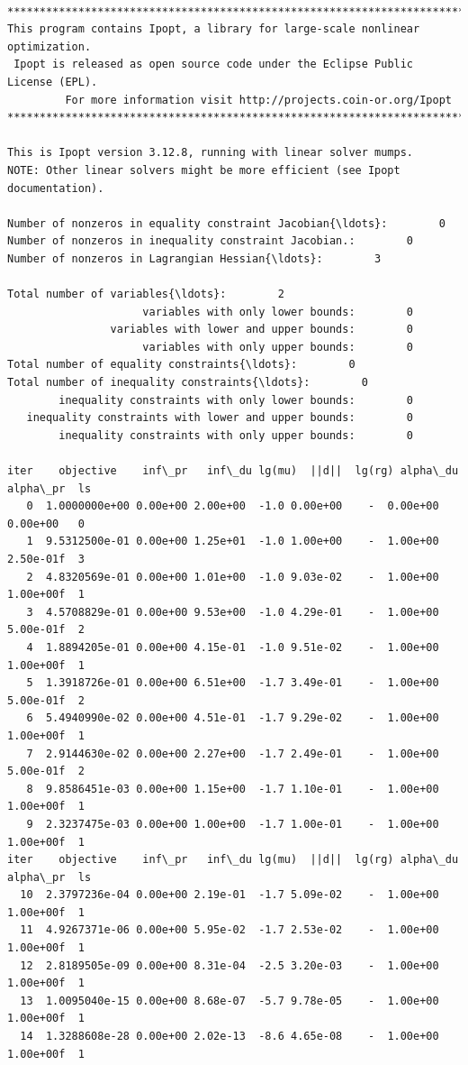 \documentclass[11pt]{article}
\begin{document}
    \begin{Verbatim}[commandchars=\\\{\}]

******************************************************************************
This program contains Ipopt, a library for large-scale nonlinear optimization.
 Ipopt is released as open source code under the Eclipse Public License (EPL).
         For more information visit http://projects.coin-or.org/Ipopt
******************************************************************************

This is Ipopt version 3.12.8, running with linear solver mumps.
NOTE: Other linear solvers might be more efficient (see Ipopt documentation).

Number of nonzeros in equality constraint Jacobian{\ldots}:        0
Number of nonzeros in inequality constraint Jacobian.:        0
Number of nonzeros in Lagrangian Hessian{\ldots}:        3

Total number of variables{\ldots}:        2
                     variables with only lower bounds:        0
                variables with lower and upper bounds:        0
                     variables with only upper bounds:        0
Total number of equality constraints{\ldots}:        0
Total number of inequality constraints{\ldots}:        0
        inequality constraints with only lower bounds:        0
   inequality constraints with lower and upper bounds:        0
        inequality constraints with only upper bounds:        0

iter    objective    inf\_pr   inf\_du lg(mu)  ||d||  lg(rg) alpha\_du alpha\_pr  ls
   0  1.0000000e+00 0.00e+00 2.00e+00  -1.0 0.00e+00    -  0.00e+00 0.00e+00   0
   1  9.5312500e-01 0.00e+00 1.25e+01  -1.0 1.00e+00    -  1.00e+00 2.50e-01f  3
   2  4.8320569e-01 0.00e+00 1.01e+00  -1.0 9.03e-02    -  1.00e+00 1.00e+00f  1
   3  4.5708829e-01 0.00e+00 9.53e+00  -1.0 4.29e-01    -  1.00e+00 5.00e-01f  2
   4  1.8894205e-01 0.00e+00 4.15e-01  -1.0 9.51e-02    -  1.00e+00 1.00e+00f  1
   5  1.3918726e-01 0.00e+00 6.51e+00  -1.7 3.49e-01    -  1.00e+00 5.00e-01f  2
   6  5.4940990e-02 0.00e+00 4.51e-01  -1.7 9.29e-02    -  1.00e+00 1.00e+00f  1
   7  2.9144630e-02 0.00e+00 2.27e+00  -1.7 2.49e-01    -  1.00e+00 5.00e-01f  2
   8  9.8586451e-03 0.00e+00 1.15e+00  -1.7 1.10e-01    -  1.00e+00 1.00e+00f  1
   9  2.3237475e-03 0.00e+00 1.00e+00  -1.7 1.00e-01    -  1.00e+00 1.00e+00f  1
iter    objective    inf\_pr   inf\_du lg(mu)  ||d||  lg(rg) alpha\_du alpha\_pr  ls
  10  2.3797236e-04 0.00e+00 2.19e-01  -1.7 5.09e-02    -  1.00e+00 1.00e+00f  1
  11  4.9267371e-06 0.00e+00 5.95e-02  -1.7 2.53e-02    -  1.00e+00 1.00e+00f  1
  12  2.8189505e-09 0.00e+00 8.31e-04  -2.5 3.20e-03    -  1.00e+00 1.00e+00f  1
  13  1.0095040e-15 0.00e+00 8.68e-07  -5.7 9.78e-05    -  1.00e+00 1.00e+00f  1
  14  1.3288608e-28 0.00e+00 2.02e-13  -8.6 4.65e-08    -  1.00e+00 1.00e+00f  1


\end{Verbatim}
\end{document}
